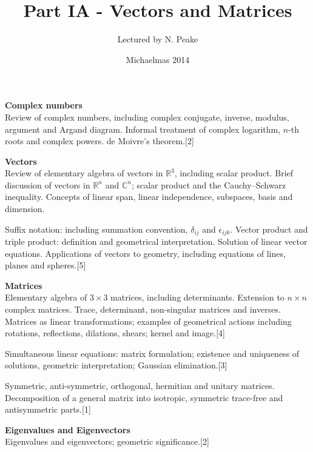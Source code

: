 \documentclass[a4paper]{article}
\title{Part IA - Vectors and Matrices}
\author{Lectured by N. Peake}
\date{Michaelmas 2014}
\theoremstyle{definition}
\newcommand{\R}{\mathbb{R}}
\newcommand{\C}{\mathbb{C}}
\begin{document}
\maketitle
{\small \noindent\textbf{Complex numbers}\\
Review of complex numbers, including complex conjugate, inverse, modulus, argument and Argand diagram. Informal treatment of complex logarithm, $n$-th roots and complex powers. de Moivre's theorem.\hspace*{\fill}[2]

\vspace{10pt}
\noindent\textbf{Vectors}\\
Review of elementary algebra of vectors in $\R^3$, including scalar product. Brief discussion of vectors in $\R^n$ and $\C^n$; scalar product and the Cauchy–Schwarz inequality. Concepts of linear span, linear independence, subspaces, basis and dimension.

\vspace{5pt}
\noindent Suffix notation: including summation convention, $\delta_{ij}$ and $\epsilon_{ijk}$. Vector product and triple product: definition and geometrical interpretation. Solution of linear vector equations. Applications of vectors to geometry, including equations of lines, planes and spheres.\hspace*{\fill}[5]

\vspace{10pt}
\noindent\textbf{Matrices}\\
Elementary algebra of $3\times 3$ matrices, including determinants. Extension to $n\times n$ complex matrices. Trace, determinant, non-singular matrices and inverses. Matrices as linear transformations; examples of geometrical actions including rotations, reflections, dilations, shears; kernel and image.\hspace*{\fill}[4]

\vspace{5pt}
\noindent Simultaneous linear equations: matrix formulation; existence and uniqueness of solutions, geometric interpretation; Gaussian elimination.\hspace*{\fill}[3]

\vspace{5pt}
\noindent Symmetric, anti-symmetric, orthogonal, hermitian and unitary matrices. Decomposition of a general matrix into isotropic, symmetric trace-free and antisymmetric parts.\hspace*{\fill}[1]

\vspace{10pt}
\noindent\textbf{Eigenvalues and Eigenvectors}\\
Eigenvalues and eigenvectors; geometric significance.\hspace*{\fill}[2]

}
\end{document}
